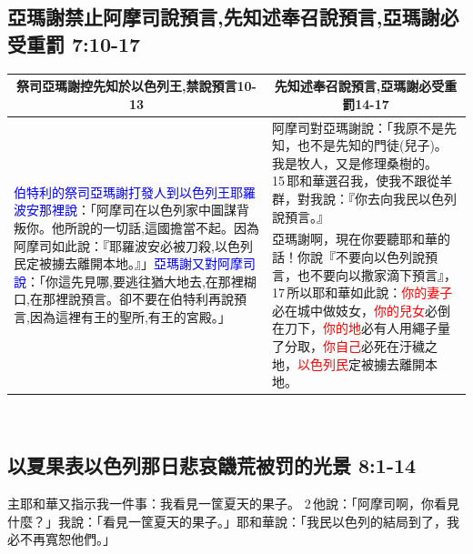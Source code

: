 \subsection{亞瑪謝禁止阿摩司說預言,先知述奉召說預言,亞瑪謝必受重罰 7:10-17}
\begin{table}[H]
\centering
\begin{tabular}{p{7.5cm}|p{10.00cm}}\hline\hline
\multicolumn{1}{c|}{祭司亞瑪謝控先知於以色列王,禁說預言10-13}&\multicolumn{1}{c}{先知述奉召說預言,亞瑪謝必受重罰14-17}\\\hline
\multirow{2}{7.8cm}{\textcolor{blue}{伯特利的祭司亞瑪謝打發人到以色列王耶羅波安那裡說}：「阿摩司在以色列家中圖謀背叛你。他所說的一切話,這國擔當不起。因為阿摩司如此說：『耶羅波安必被刀殺,以色列民定被擄去離開本地。』」\textcolor{blue}{亞瑪謝又對阿摩司說}：「你這先見哪,要逃往猶大地去,在那裡糊口,在那裡說預言。卻不要在伯特利再說預言,因為這裡有王的聖所,有王的宮殿。」}
&阿摩司對亞瑪謝說：「我原不是先知，也不是先知的門徒(兒子)。我是牧人，又是修理桑樹的。 15 耶和華選召我，使我不跟從羊群，對我說：『你去向我民以色列說預言。』\\\cline{2-2}
&亞瑪謝啊，現在你要聽耶和華的話！你說『不要向以色列說預言，也不要向以撒家滴下預言』， 17 所以耶和華如此說：\textcolor{red}{你的妻子}必在城中做妓女，\textcolor{red}{你的兒女}必倒在刀下，\textcolor{red}{你的地}必有人用繩子量了分取，\textcolor{red}{你自己}必死在汙穢之地，\textcolor{red}{以色列民}定被擄去離開本地。\\\hline
\end{tabular}
\end{table} 


\subsection{以夏果表以色列那日悲哀饑荒被罚的光景 8:1-14}

主耶和華又指示我一件事：我看見一筐夏天的果子。 2 他說：「阿摩司啊，你看見什麼？」我說：「看見一筐夏天的果子。」耶和華說：「我民以色列的結局到了，我必不再寬恕他們。」

